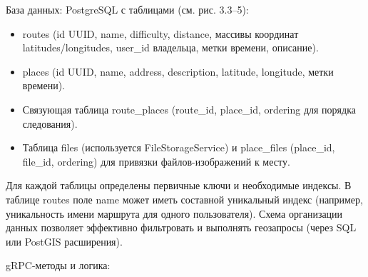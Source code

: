 База данных: PostgreSQL с таблицами (см. рис. 3.3–5):
\begin{itemize}
    \item routes (id UUID, name, difficulty, distance, массивы координат \\ latitudes/longitudes, user\_id владельца, метки времени, описание).
    \item places (id UUID, name, address, description, latitude, longitude, метки времени).
    \item Связующая таблица route\_places (route\_id, place\_id, ordering для порядка следования).
    \item Таблица files (используется FileStorageService) и place\_files (place\_id, file\_id, ordering) для привязки файлов-изображений к месту.
\end{itemize}
\noindent Для каждой таблицы определены первичные ключи и необходимые индексы. В таблице routes поле name может иметь составной уникальный индекс (например, уникальность имени маршрута для одного пользователя). Схема организации данных позволяет эффективно фильтровать и выполнять геозапросы (через SQL или PostGIS расширения).

gRPC-методы и логика:

